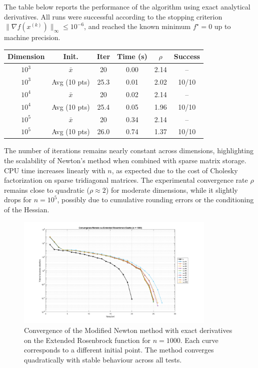 \documentclass[a4paper,12pt]{article}
\begin{document}
	The table below reports the performance of the algorithm using exact analytical derivatives. All runs were successful according to the stopping criterion \( \|\nabla f(x^{(k)})\|_\infty \leq 10^{-6} \), and reached the known minimum \( f^\star = 0 \) up to machine precision.
	
	\begin{center}
		\begin{tabular}{|c|c|c|c|c|c|}
			\hline
			\textbf{Dimension} & \textbf{Init.} & \textbf{Iter} & \textbf{Time (s)} & \textbf{\(\rho\)} & \textbf{Success} \\
			\hline
			$10^3$ & $\bar{x}$         & 20   & 0.00 & 2.14 & -- \\
			$10^3$ & Avg (10 pts)      & 25.3 & 0.01 & 2.02 & 10/10 \\
			\hline
			$10^4$ & $\bar{x}$         & 20   & 0.02 & 2.14 & -- \\
			$10^4$ & Avg (10 pts)      & 25.4 & 0.05 & 1.96 & 10/10 \\
			\hline
			$10^5$ & $\bar{x}$         & 20   & 0.34 & 2.14 & -- \\
			$10^5$ & Avg (10 pts)      & 26.0 & 0.74 & 1.37 & 10/10 \\
			\hline
		\end{tabular}
	\end{center}
	
	
	\vspace{0.5em}
	
	The number of iterations remains nearly constant across dimensions, highlighting the scalability of Newton’s method when combined with sparse matrix storage. CPU time increases linearly with \(n\), as expected due to the cost of Cholesky factorization on sparse tridiagonal matrices. The experimental convergence rate \(\rho\) remains close to quadratic (\(\rho \approx 2\)) for moderate dimensions, while it slightly drops for \(n=10^5\), possibly due to cumulative rounding errors or the conditioning of the Hessian.
	
	
	\begin{figure}[htbp]
		\centering
		\includegraphics[width=0.85\textwidth]{../immagini/ext_1k.png}
		\caption{Convergence of the Modified Newton method with exact derivatives on the Extended Rosenbrock function for $n=1000$. Each curve corresponds to a different initial point. The method converges quadratically with stable behaviour across all tests.}
		\label{fig:extnewton_1k}
	\end{figure}
	
\end{document}
